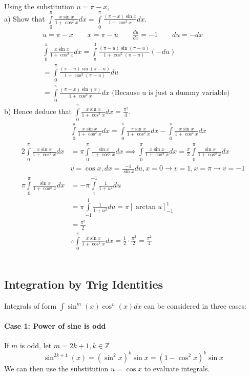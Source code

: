 \documentclass[a4paper,twoside,10pt]{article}
\newenvironment{examquestion}[1]{%
	\mbox{}\\\tcolorbox[beamer,breakable,%
	title=Exam-style Question: #1,standard jigsaw,opacityback=0, colframe=red!75!black, boxrule=2pt]}{\endtcolorbox\mbox{}\\}
\begin{document}
			\begin{examquestion}{}
				Using the substitution $u=\pi-x$,\\
				a) Show that $\displaystyle\int\limits_0^\pi\frac{x\sin x}{1+\cos^2x}dx=\int\limits_0^\pi\frac{(\pi-x)\sin x}{1+\cos^2x}dx$.\\
				\begin{align*}
					&u=\pi-x \qquad x=\pi-u \qquad \frac{du}{dx}=-1 \qquad du=-dx \\
					&\int\limits_{0}^{\pi}\frac{x\sin x}{1+\cos^2x}dx=\int\limits_{\pi}^{0}\frac{(\pi-u)\sin(\pi-u)}{1+\cos^2(\pi-u)}(-du)\\
					&=\int\limits_0^\pi\frac{(\pi-u)\sin(\pi-u)}{1+\cos^2(\pi-u)}du \\
					&=\int\limits_0^\pi\frac{(\pi-x)\sin(x)}{1+\cos^2x}dx \text{ (Because u is just a dummy variable)}
				\end{align*}
				b) Hence deduce that $\displaystyle\int\limits_0^\pi\frac{x\sin x}{1+\cos^2x}dx=\frac{\pi^2}{4}$.
				\begin{align*}
					&\int\limits_{0}^{\pi}\frac{x\sin x}{1+\cos^2x}dx=\int\limits_{0}^{\pi}\frac{\pi\sin x}{1+\cos^2x}dx-\int\limits_{0}^{\pi}\frac{x\sin x}{1+\cos^2x}dx \\
					2\int\limits_{0}^{\pi}\frac{x\sin x}{1+\cos^2x}dx&=\pi\int\limits_0^\pi\frac{\sin x}{1+\cos^2 x}dx\implies\int\limits_0^\pi\frac{x\sin x}{1+\cos^2x}dx=\frac{\pi}{2}\int\limits_0^\pi\frac{\sin x}{1+\cos^2x}dx\\
					&v=\cos x, dx=\frac{-1}{\sin x}du, x=0\to v=1, x=\pi\to v=-1 \\
					\pi\int\limits_0^\pi\frac{\sin x}{1+\cos^2 x}dx&=-\pi\int\limits_1^{-1}\frac{1}{1+u^2}du\\
					&=\pi\int\limits_{-1}^1\frac{1}{1+u^2}du=\pi\left[\arctan u\right]_{-1}^1 \\
					&=\frac{\pi^2}{2}\\
					&\therefore \int\limits_0^\pi\frac{x\sin x}{1+\cos^2 x}dx=\frac{1}{2}\cdot\frac{\pi^2}{2}=\frac{\pi^2}{4}
				\end{align*}
			\end{examquestion}
		\subsection{Integration by Trig Identities}
			Integrals of form $\displaystyle \int\sin^m(x)\cos^n(x)dx$ can be considered in three cases:
			\paragraph{Case 1: Power of sine is odd} If $m$ is odd, let $m=2k+1,k\in\mathbb{Z}$
			\[
				\sin^{2k+1}(x)=\left(\sin^2x\right)^k\sin x=(1-\cos^2x)^k\sin x
			\]
			We can then use the substitution $u=\cos x$ to evaluate integrals.
\end{document}
